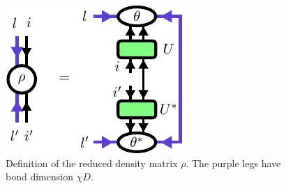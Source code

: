 \begin{figure}
	\centering
	\includegraphics[scale=1]{figures/tikz/YB_isoTPS/rho_definition/rho_definition.pdf}
	\caption{Definition of the reduced density matrix $\rho$. The purple legs have bond dimension $\chi D$.}
	\label{fig:disentangling_rho_definition}
\end{figure}

